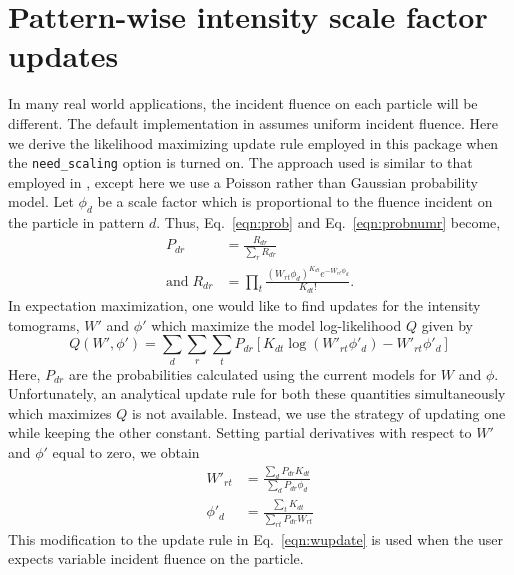 \documentclass[]{iucr}              %
\begin{document}
\section{Pattern-wise intensity scale factor updates}\label{sec:rescaling}
In many real world applications, the incident fluence on each particle will be different. The default implementation in  assumes uniform incident fluence. Here we derive the likelihood maximizing update rule employed in this package when the \texttt{need\_scaling} option is turned on. The approach used is similar to that employed in , except here we use a Poisson rather than Gaussian probability model. Let $\phi_d$ be a scale factor which is proportional to the fluence incident on the particle in pattern $d$. Thus, Eq.~\ref{eqn:prob} and Eq.~\ref{eqn:probnumr} become,
\begin{align}
P_{dr} &= \frac{R_{dr}}{\sum\limits_r R_{dr}} \\
\mathrm{and }\;R_{dr} &= \prod_t \frac{(W_{rt}\phi_d)^{K_{dt}} e^{-W_{rt}\phi_d}}{K_{dt}!}.
\end{align}
In expectation maximization, one would like to find updates for the intensity tomograms, $W'$ and $\phi'$ which maximize the model log-likelihood $Q$ given by
\[Q(W', \phi') = \sum_d \sum_r \sum_t P_{dr} \left[K_{dt}\log(W'_{rt} \phi'_d) - W'_{rt} \phi'_d\right]\]
Here, $P_{dr}$ are the probabilities calculated using the current models for $W$ and $\phi$. Unfortunately, an analytical update rule for both these quantities simultaneously which maximizes $Q$ is not available. Instead, we use the strategy of updating one while keeping the other constant. Setting partial derivatives with respect to $W'$ and $\phi'$ equal to zero, we obtain
\begin{align}
W'_{rt} &= \frac{\sum\limits_d P_{dr} K_{dt}}{\sum\limits_d P_{dr} \phi_d} \\
\phi'_d &= \frac{\sum\limits_t K_{dt}}{\sum\limits_{rt} P_{dr} W_{rt}}
\end{align}
This modification to the update rule in Eq.~\ref{eqn:wupdate} is used when the user expects variable incident fluence on the particle.


\end{document}
